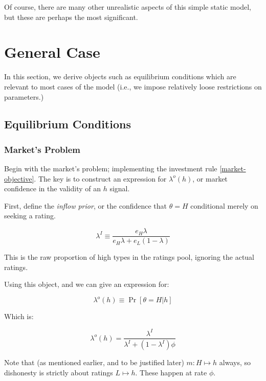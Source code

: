 \documentclass{article}
\theoremstyle{definition}
\begin{document}
Of course, there are many other unrealistic aspects of this simple static model, but these are perhaps the most significant.

\newpage 

\section{General Case}

In this section, we derive objects such as equilibrium conditions which are relevant to most cases of the model (i.e., we impose relatively loose restrictions on parameters.)

\subsection{Equilibrium Conditions}

\subsubsection{Market's Problem}

Begin with the market's problem; implementing the investment rule \eqref{market-objective}. The key is to construct an expression for $\lambda^o(h)$, or market confidence in the validity of an $h$ signal.

First, define the \emph{inflow prior}, or the confidence that $\theta = H$ conditional merely on seeking a rating. 

\begin{equation}
    \label{inflow-prior}
    \lambda^I \equiv \frac{e_H \lambda}{e_H \lambda + e_L (1 - \lambda)}
\end{equation}

This is the raw proportion of high types in the ratings pool, ignoring the actual ratings.

Using this object, and we can give an expression for:

\begin{equation}
    \label{lambda-o}
    \lambda^o(h) \equiv \Pr[\theta = H | h]
\end{equation}

Which is: 

\begin{equation}
    \lambda^o(h) = \frac{\lambda^I}{\lambda^I + (1 - \lambda^I)\phi}
\end{equation}

Note that (as mentioned earlier, and to be justified later) $m : H \mapsto h$ always, so dishonesty is strictly about ratings $L \mapsto h$. These happen at rate $\phi$.
\end{document}
